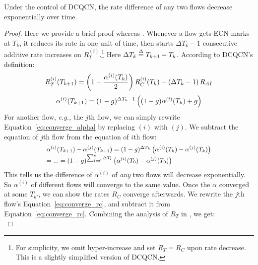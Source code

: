 \begin{thm}
Under the control of DCQCN, the rate difference of any two flows decrease exponentially
over time. 
\end{thm}
\begin{proof}
Here we provide a brief proof whereas .
Whenever a flow gets ECN marks at $T_k$, it reduces its
rate in one unit of time, then starts $\Delta {T_k} -1 $ consecutive additive rate
increases on $R_T^{(i)}$.\footnote{For simplicity, we omit hyper-increase and set 
$R_T = R_C$ upon rate decrease. This is a slightly simplified version of DCQCN.}
Here $\Delta {T_k} \buildrel \Delta \over = {T_{k + 1}} - {T_k}$. According to DCQCN's definition:
\begin{equation}
\small
R_T^{(i)}({T_{k + 1}}) = \left( {1 - \frac{{{\alpha ^{(i)}}({T_k})}}{2}} \right)R_C^{(i)}({T_k}) + \left( {\Delta {T_k} - 1} \right){R_{AI}}
\label{eq:converge_rc}
\end{equation}
\begin{equation}
\small
{\alpha ^{(i)}}({T_{k + 1}}) = {(1 - g)^{\Delta {T_k} - 1}}\left( {(1 - g){\alpha ^{(i)}}({T_k}) + g} \right)
\label{eq:converge_alpha}
\end{equation}
For another flow, {\em e.g.,} the $j$th flow, we can simply rewrite Equation~\ref{eq:converge_alpha} by 
replacing $(i)$ with $(j)$. We subtract the equation of $j$th flow from the equation of $i$th flow:
\begin{equation}
\small
\begin{array}{l}
{\alpha ^{(i)}}({T_{k + 1}}) - {\alpha ^{(j)}}({T_{k + 1}}) = {(1 - g)^{\Delta {T_k}}}\left( {{\alpha ^{(i)}}({T_k}) - {\alpha ^{(j)}}({T_k})} \right)\\
 = ... = {(1 - g)^{\sum\nolimits_{l = 0}^k {\Delta {T_l}} }}\left( {{\alpha ^{(i)}}({T_0}) - {\alpha ^{(j)}}({T_0})} \right)
\end{array}
\label{eq:converge_alphaarray}
\end{equation}
This tells us the difference of $\alpha^{(i)}$ of {\em any} two flows will decrease exponentially. So $\alpha^{(i)}$
of different flows will converge to the same value. Once the $\alpha$ converged at some $T_{k'}$, we can show 
the rates $R_C$ converge afterwards. We rewrite the $j$th flow's Equation~\ref{eq:converge_rc}, and subtract it 
from Equation~\ref{eq:converge_rc}. Combining the analysis of $R_T$ in , we get:
\begin{equation}

\end{equation}
\end{proof}
